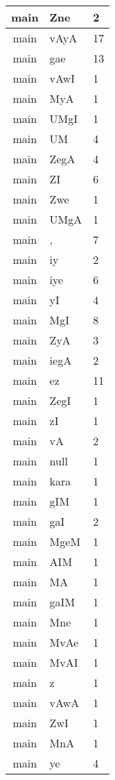 \documentclass[a4 paper]{article}
\begin{document}
\begin{longtable}{cp{}p{}}
\midrule main & Zne & 2\\ \midrule main & vAyA & 17\\ \midrule main & gae & 13\\ \midrule main & vAwI & 1\\ \midrule main & MyA & 1\\ \midrule main & UMgI & 1\\ \midrule main & UM & 4\\ \midrule main & ZegA & 4\\ \midrule main & ZI & 6\\ \midrule main & Zwe & 1\\ \midrule main & UMgA & 1\\ \midrule main & , & 7\\ \midrule main & iy & 2\\ \midrule main & iye & 6\\ \midrule main & yI & 4\\ \midrule main & MgI & 8\\ \midrule main & ZyA & 3\\ \midrule main & iegA & 2\\ \midrule main & ez & 11\\ \midrule main & ZegI & 1\\ \midrule main & zI & 1\\ \midrule main & vA & 2\\ \midrule main & null & 1\\ \midrule main & kara & 1\\ \midrule main & gIM & 1\\ \midrule main & gaI & 2\\ \midrule main & MgeM & 1\\ \midrule main & AIM & 1\\ \midrule main & MA & 1\\ \midrule main & gaIM & 1\\ \midrule main & Mne & 1\\ \midrule main & MvAe & 1\\ \midrule main & MvAI & 1\\ \midrule main & z & 1\\ \midrule main & vAwA & 1\\ \midrule main & ZwI & 1\\ \midrule main & MnA & 1\\ \midrule main & ye & 4\\ \midrule 

\end{longtable}
\end{document}
